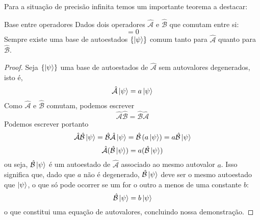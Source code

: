     Para a situação de precisão infinita temos um importante teorema a destacar:
    \begin{theorem}{Base entre operadores}{}
        Dados dois operadores $\mathcal{\hat{A}}$ e $\mathcal{\hat{B}}$ que comutam entre si:
        \begin{equation*}
            [\mathcal{\hat{A}},\mathcal{\hat{B}}] = 0
        \end{equation*}
        Sempre existe uma base de autoestados $\{\ket{\psi}\}$ comum tanto para $\mathcal{\hat{A}}$ quanto para $\mathcal{\hat{B}}$.
    \end{theorem}
    \begin{proof}
        Seja $\{\ket{\psi}\}$ uma base de autoestados de $\mathcal{\hat{A}}$ sem autovalores degenerados, isto é,
        \begin{equation*}
            \mathcal{\hat{A}}\ket{\psi} = a\ket{\psi}
        \end{equation*}
        Como $\mathcal{\hat{A}}$ e $\mathcal{\hat{B}}$ comutam, podemos escrever
        \begin{equation*}
            \mathcal{\hat{A}}\mathcal{\hat{B}} = \mathcal{\hat{B}}\mathcal{\hat{A}}
        \end{equation*}
        Podemos escrever portanto
        \begin{equation*}
            \mathcal{\hat{A}}\mathcal{\hat{B}}\ket{\psi} = \mathcal{\hat{B}}\mathcal{\hat{A}}\ket{\psi} = \mathcal{\hat{B}}\left(a\ket{\psi}\right) = a\mathcal{\hat{B}}\ket{\psi}
        \end{equation*}
        \begin{equation*}
            \mathcal{\hat{A}}(\mathcal{\hat{B}}\ket{\psi}) = a(\mathcal{\hat{B}}\ket{\psi})
        \end{equation*}
        ou seja, $\mathcal{\hat{B}}\ket{\psi}$ é um autoestado de $\mathcal{\hat{A}}$ associado ao mesmo autovalor $a$. Isso significa que, dado que $a$ não é degenerado, $\mathcal{\hat{B}}\ket{\psi}$ deve ser o mesmo autoestado que $\ket{\psi}$, o que só pode ocorrer se um for o outro a menos de uma constante $b$:
        \begin{equation*}
            \mathcal{\hat{B}}\ket{\psi} = b\ket{\psi}
        \end{equation*}
        o que constitui uma equação de autovalores, concluindo nossa demonstração.
    \end{proof}